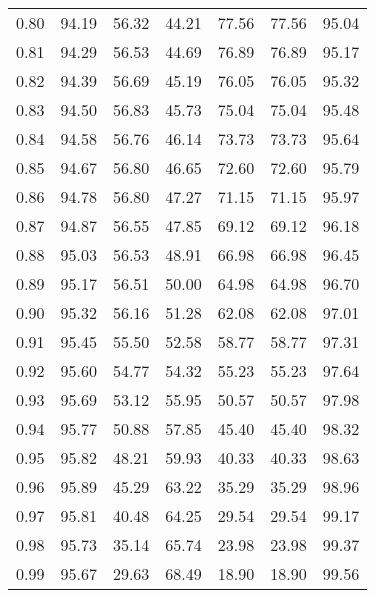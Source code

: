 \begin{tabular}{|c|c|c|c|c|c|c|}
      0.80 &     94.19 &     56.32 &      44.21 &   77.56 &      77.56 &         95.04 \\
      0.81 &     94.29 &     56.53 &      44.69 &   76.89 &      76.89 &         95.17 \\
      0.82 &     94.39 &     56.69 &      45.19 &   76.05 &      76.05 &         95.32 \\
      0.83 &     94.50 &     56.83 &      45.73 &   75.04 &      75.04 &         95.48 \\
      0.84 &     94.58 &     56.76 &      46.14 &   73.73 &      73.73 &         95.64 \\
      0.85 &     94.67 &     56.80 &      46.65 &   72.60 &      72.60 &         95.79 \\
      0.86 &     94.78 &     56.80 &      47.27 &   71.15 &      71.15 &         95.97 \\
      0.87 &     94.87 &     56.55 &      47.85 &   69.12 &      69.12 &         96.18 \\
      0.88 &     95.03 &     56.53 &      48.91 &   66.98 &      66.98 &         96.45 \\
      0.89 &     95.17 &     56.51 &      50.00 &   64.98 &      64.98 &         96.70 \\
      0.90 &     95.32 &     56.16 &      51.28 &   62.08 &      62.08 &         97.01 \\
      0.91 &     95.45 &     55.50 &      52.58 &   58.77 &      58.77 &         97.31 \\
      0.92 &     95.60 &     54.77 &      54.32 &   55.23 &      55.23 &         97.64 \\
      0.93 &     95.69 &     53.12 &      55.95 &   50.57 &      50.57 &         97.98 \\
      0.94 &     95.77 &     50.88 &      57.85 &   45.40 &      45.40 &         98.32 \\
      0.95 &     95.82 &     48.21 &      59.93 &   40.33 &      40.33 &         98.63 \\
      0.96 &     95.89 &     45.29 &      63.22 &   35.29 &      35.29 &         98.96 \\
      0.97 &     95.81 &     40.48 &      64.25 &   29.54 &      29.54 &         99.17 \\
      0.98 &     95.73 &     35.14 &      65.74 &   23.98 &      23.98 &         99.37 \\
      0.99 &     95.67 &     29.63 &      68.49 &   18.90 &      18.90 &         99.56 \\
\bottomrule
\end{tabular}
